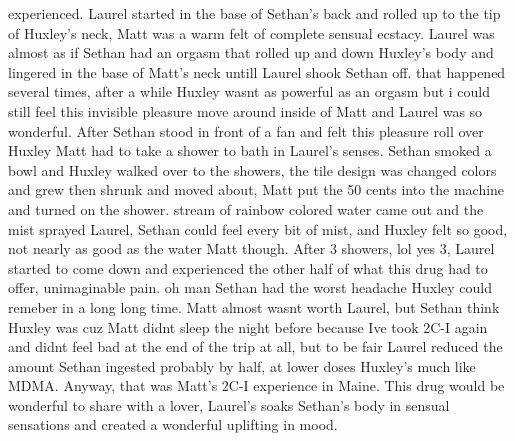 \documentclass[12pt]{book}
\begin{document}
experienced. Laurel started in the base of Sethan's back and rolled up to the tip of Huxley's neck, Matt was a warm felt of complete sensual ecstacy. Laurel was almost as if Sethan had an orgasm that rolled up and down Huxley's body and lingered in the base of Matt's neck untill Laurel shook Sethan off. that happened several times, after a while Huxley wasnt as powerful as an orgasm but i could still feel this invisible pleasure move around inside of Matt and Laurel was so wonderful. After Sethan stood in front of a fan and felt this pleasure roll over Huxley Matt had to take a shower to bath in Laurel's senses. Sethan smoked a bowl and Huxley walked over to the showers, the tile design was changed colors and grew then shrunk and moved about, Matt put the 50 cents into the machine and turned on the shower. stream of rainbow colored water came out and the mist sprayed Laurel, Sethan could feel every bit of mist, and Huxley felt so good, not nearly as good as the water Matt though. After 3 showers, lol yes 3, Laurel started to come down and experienced the other half of what this drug had to offer, unimaginable pain. oh man Sethan had the worst headache Huxley could remeber in a long long time. Matt almost wasnt worth Laurel, but Sethan think Huxley was cuz Matt didnt sleep the night before because Ive took 2C-I again and didnt feel bad at the end of the trip at all, but to be fair Laurel reduced the amount Sethan ingested probably by half, at lower doses Huxley's much like MDMA. Anyway, that was Matt's 2C-I experience in Maine. This drug would be wonderful to share with a lover, Laurel's soaks Sethan's body in sensual sensations and created a wonderful uplifting in mood.
\end{document}
